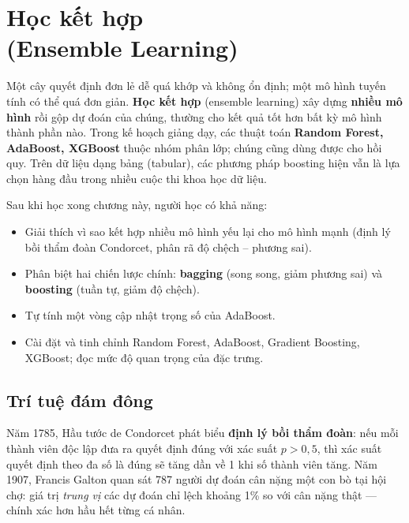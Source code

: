 
\chapter{Học kết hợp \\ (Ensemble Learning)}
\label{chap:ensemble}

Một cây quyết định đơn lẻ dễ quá khớp và không ổn định; một mô hình tuyến tính có thể quá đơn giản. \textbf{Học kết hợp} (ensemble learning) xây dựng \textbf{nhiều mô hình} rồi gộp dự đoán của chúng, thường cho kết quả tốt hơn bất kỳ mô hình thành phần nào. Trong kế hoạch giảng dạy, các thuật toán \textbf{Random Forest, AdaBoost, XGBoost} thuộc nhóm phân lớp; chúng cũng dùng được cho hồi quy. Trên dữ liệu dạng bảng (tabular), các phương pháp boosting hiện vẫn là lựa chọn hàng đầu trong nhiều cuộc thi khoa học dữ liệu.

\noindent Sau khi học xong chương này, người học có khả năng:
\begin{itemize}
    \item Giải thích vì sao kết hợp nhiều mô hình yếu lại cho mô hình mạnh (định lý bồi thẩm đoàn Condorcet, phân rã độ chệch -- phương sai).
    \item Phân biệt hai chiến lược chính: \textbf{bagging} (song song, giảm phương sai) và \textbf{boosting} (tuần tự, giảm độ chệch).
    \item Tự tính một vòng cập nhật trọng số của AdaBoost.
    \item Cài đặt và tinh chỉnh Random Forest, AdaBoost, Gradient Boosting, XGBoost; đọc mức độ quan trọng của đặc trưng.
\end{itemize}

\section{Trí tuệ đám đông}

Năm 1785, Hầu tước de Condorcet phát biểu \textbf{định lý bồi thẩm đoàn}: nếu mỗi thành viên độc lập đưa ra quyết định đúng với xác suất $p > 0{,}5$, thì xác suất quyết định theo đa số là đúng sẽ tăng dần về 1 khi số thành viên tăng. Năm 1907, Francis Galton quan sát 787 người dự đoán cân nặng một con bò tại hội chợ: giá trị \textit{trung vị} các dự đoán chỉ lệch khoảng 1\% so với cân nặng thật --- chính xác hơn hầu hết từng cá nhân.

